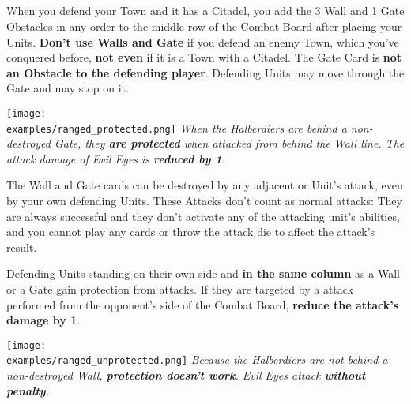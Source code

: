 \begin{multicols*}{2}
\subsection*{}
When you defend your Town and it has a Citadel, you add the 3 Wall and 1 Gate Obstacles in any order to the middle row of the Combat Board after placing your Units.
\textbf{Don't use Walls and Gate} if you defend an enemy Town, which you've conquered before, \textbf{not even} if it is a Town with a Citadel.
The Gate Card is \textbf{not an Obstacle to the defending player}.
Defending Units may move through the Gate and may stop on it.

\vspace*{\fill}
\texttt{[image: \\examples/ranged\_protected.png]}
{\textit{When the Halberdiers are behind a non-destroyed Gate, they \textbf{are protected} when attacked from behind the Wall line.
  The  attack damage of Evil Eyes is \textbf{reduced by 1}.}}
\columnbreak

The Wall and Gate cards can be destroyed by any adjacent  or  Unit's attack, even by your own defending Units.
These Attacks don't count as normal attacks: They are always successful and they don't activate any of the attacking unit's  abilities, and you cannot play any cards or throw the attack die to affect the attack's result.

Defending Units standing on their own side and \textbf{in the same column} as a Wall or a Gate gain protection from  attacks.
If they are targeted by a  attack performed from the opponent's side of the Combat Board, \textbf{reduce the attack's damage by 1}.

\vspace*{\fill}
\texttt{[image: \\examples/ranged\_unprotected.png]}
{\textit{Because the Halberdiers are not behind a non-destroyed Wall, \textbf{protection doesn't work}.
  Evil Eyes attack \textbf{without penalty}.}}
\newline\newline
\end{multicols*}

\clearpage

